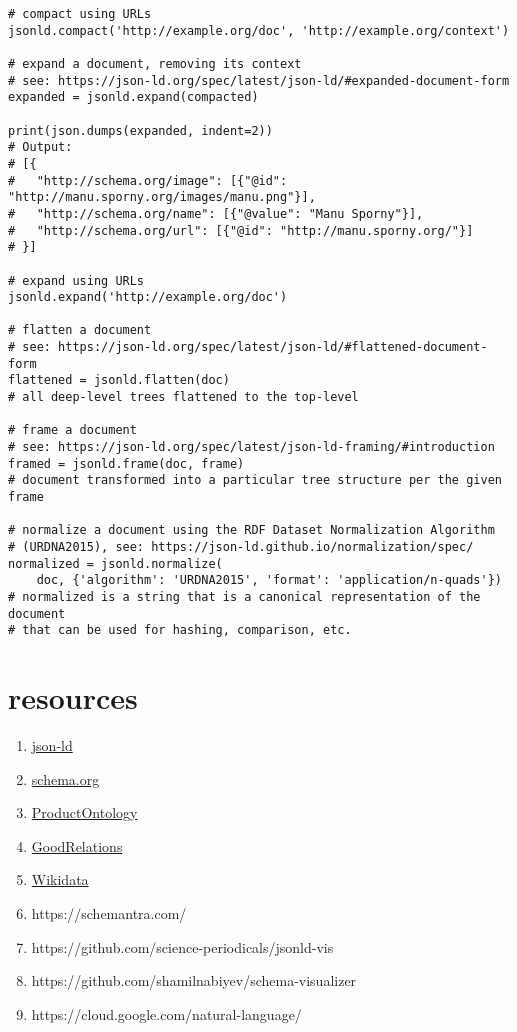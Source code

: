 \documentclass[
  letterpaper,
  DIV=11,
  numbers=noendperiod]{scrartcl}
\providecommand{\tightlist}{%
  \setlength{\itemsep}{0pt}\setlength{\parskip}{0pt}}\usepackage{longtable,booktabs,array}
\begin{document}
\begin{verbatim}
# compact using URLs
jsonld.compact('http://example.org/doc', 'http://example.org/context')

# expand a document, removing its context
# see: https://json-ld.org/spec/latest/json-ld/#expanded-document-form
expanded = jsonld.expand(compacted)

print(json.dumps(expanded, indent=2))
# Output:
# [{
#   "http://schema.org/image": [{"@id": "http://manu.sporny.org/images/manu.png"}],
#   "http://schema.org/name": [{"@value": "Manu Sporny"}],
#   "http://schema.org/url": [{"@id": "http://manu.sporny.org/"}]
# }]

# expand using URLs
jsonld.expand('http://example.org/doc')

# flatten a document
# see: https://json-ld.org/spec/latest/json-ld/#flattened-document-form
flattened = jsonld.flatten(doc)
# all deep-level trees flattened to the top-level

# frame a document
# see: https://json-ld.org/spec/latest/json-ld-framing/#introduction
framed = jsonld.frame(doc, frame)
# document transformed into a particular tree structure per the given frame

# normalize a document using the RDF Dataset Normalization Algorithm
# (URDNA2015), see: https://json-ld.github.io/normalization/spec/
normalized = jsonld.normalize(
    doc, {'algorithm': 'URDNA2015', 'format': 'application/n-quads'})
# normalized is a string that is a canonical representation of the document
# that can be used for hashing, comparison, etc.
\end{verbatim}

\hypertarget{resources}{%
\section{resources}\label{resources}}

\begin{enumerate}
\def\labelenumi{\arabic{enumi}.}
\tightlist
\item
  \href{https://json-ld.org/}{json-ld}
\item
  \href{https://schema.org/}{schema.org}
\item
  \href{http://www.productontology.org/}{ProductOntology}
\item
  \href{http://www.heppnetz.de/projects/goodrelations/}{GoodRelations}
\item
  \href{https://www.wikidata.org/wiki/Wikidata:Main_Page}{Wikidata}
\item
  https://schemantra.com/
\item
  https://github.com/science-periodicals/jsonld-vis
\item
  https://github.com/shamilnabiyev/schema-visualizer
\item
  https://cloud.google.com/natural-language/
\end{enumerate}
\end{document}
